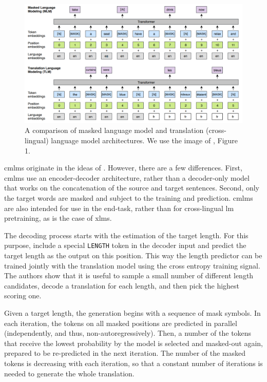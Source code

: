 \begin{figure}
  \centering

  \includegraphics[width=\textwidth]{img/mlm-xlm.png}

  \caption{A comparison of masked language model and translation
    (cross-lingual) language model architectures. We use the image of
    \citet{conneau-lample-2019-cross}, Figure 1.}%
  \label{fig:mlm-xlm-example}
\end{figure}

\Aclp{cmlm} originate in the ideas of
\citet{conneau-lample-2019-cross}. However, there are a few differences. First,
\acp{cmlm} use an encoder-decoder architecture, rather than a decoder-only
model that works on the concatenation of the source and target
sentences. Second, only the target words are masked and subject to the training
and prediction. \Acp{cmlm} are also intended for use in the end-task, rather
than for cross-lingual \ac{lm} pretraining, as is the case of \acp{xlm}.

The decoding process starts with the estimation of the target length. For this
purpose, \citet{ghazvininejad-etal-2019-mask} include a special \texttt{LENGTH}
token in the decoder input and predict the target length as the output on this
position. This way the length predictor can be trained jointly with the
translation model using the cross entropy training signal. The authors show
that it is useful to sample a small number of different length candidates,
decode a translation for each length, and then pick the highest scoring one.

Given a target length, the generation begins with a sequence of mask symbols.
In each iteration, the tokens on all masked positions are predicted in parallel
(independently, and thus, non-autoregressively). Then, a number of the tokens
that receive the lowest probability by the model is selected and masked-out
again, prepared to be re-predicted in the next iteration. The number of the
masked tokens is decreasing with each iteration, so that a constant number of
iterations is needed to generate the whole translation.

